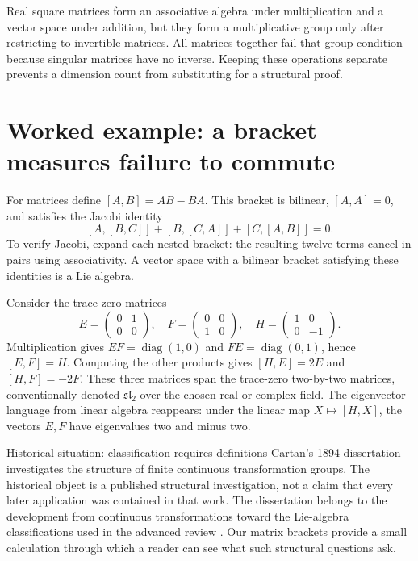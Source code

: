 Real square matrices form an associative algebra under multiplication and a
vector space under addition, but they form a multiplicative group only after
restricting to invertible matrices. All matrices together fail that group
condition because singular matrices have no inverse. Keeping these operations
separate prevents a dimension count from substituting for a structural proof.

\section{Worked example: a bracket measures failure to commute}
For matrices define $[A,B]=AB-BA$. This bracket is bilinear,
$[A,A]=0$, and satisfies the Jacobi identity
\[
 [A,[B,C]]+[B,[C,A]]+[C,[A,B]]=0.
\]
To verify Jacobi, expand each nested bracket: the resulting twelve terms
cancel in pairs using associativity. A vector space with a bilinear bracket
satisfying these identities is a Lie algebra.

Consider the trace-zero matrices
\[
 E=\begin{pmatrix}0&1\\0&0\end{pmatrix},\quad
 F=\begin{pmatrix}0&0\\1&0\end{pmatrix},\quad
 H=\begin{pmatrix}1&0\\0&-1\end{pmatrix}.
\]
Multiplication gives $EF=\operatorname{diag}(1,0)$ and
$FE=\operatorname{diag}(0,1)$, hence $[E,F]=H$. Computing the other
products gives $[H,E]=2E$ and $[H,F]=-2F$. These three matrices span
the trace-zero two-by-two matrices, conventionally denoted
$\mathfrak{sl}_2$ over the chosen real or complex field. The eigenvector
language from linear algebra reappears: under the linear map
$X\mapsto[H,X]$, the vectors $E,F$ have eigenvalues two and minus two.

\begin{learningcard}[breakable=false]{Historical situation: classification requires definitions}
Cartan's 1894 dissertation investigates the structure of finite continuous
transformation groups. The historical object is a published structural
investigation, not a claim that every later application was contained in that
work. The dissertation belongs to the development from continuous
transformations toward the Lie-algebra classifications used in the advanced
review \citep{cartan1894}. Our matrix brackets provide a small calculation
through which a reader can see what such structural questions ask.
\end{learningcard}

